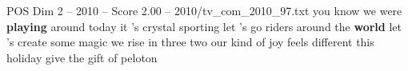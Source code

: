 \begin{textsample}{POS Dim 2 – 2010 – Score 2.00 – 2010/tv\_com\_2010\_97.txt}  \label{ex:f2_pos_044}
you know we were \textbf{playing} around today it 's crystal sporting let 's go riders around the \textbf{world} let 's create some magic we rise in three two our kind of joy feels different this holiday give the gift of peloton

\end{textsample}

